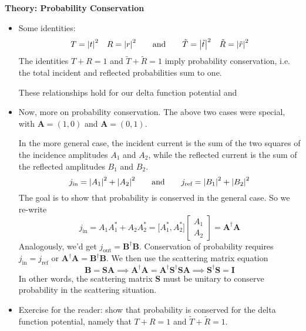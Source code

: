 \documentclass[11pt, a4paper]{article}
\newcommand{\eqtext}[1]{\qquad \text{#1} \qquad}
\renewcommand{\vec}[1]{\bm{#1}} %
\newcommand{\mat}[1]{\mathbf{#1}} %
\begin{document}
\textbf{Theory: Probability Conservation}
\begin{itemize}
	\item Some identities:
	\begin{equation*}
		T = \abs{t}^{2} \quad R = \abs{r}^{2} \eqtext{and} 		\tilde{T} = \abs{\tilde{t}}^{2} \quad \tilde{R} = \abs{\tilde{r}}^{2}
	\end{equation*}
	The identities $ T + R = 1 $ and $ \tilde{T} + \tilde{R} = 1 $ imply probability conservation, i.e. the total incident and reflected probabilities sum to one. 
	
	These relationships hold for our delta function potential and 
	
	\item Now, more on probability conservation. The above two cases were special, with $ \vec{A} = (1, 0) $ and $ \vec{A} = (0, 1) $. 
	
	In the more general case, the incident current is the sum of the two squares of the incidence amplitudes $ A_{1} $ and $ A_{2} $, while the reflected current is the sum of the reflected amplitudes $ B_{1} $ and $ B_{2} $. 
	\begin{equation*}
		j_{\text{in}} = \abs{A_{1}}^{2} + \abs{A_{2}}^{2} \eqtext{and} j_{\text{ref}} = \abs{B_{1}}^{2} + \abs{B_{2}}^{2}
	\end{equation*}
	The goal is to show that probability is conserved in the general case. So we re-write
	\begin{equation*}
		j_{\text{in}} = A_{1}A_{1}^{*} + A_{2}A_{2}^{*} = \big[A_{1}^{*}, A_{2}^{*}\big]
		\begin{bmatrix}
			A_{1}\\
			A_{2}
		\end{bmatrix}
		= \vec{A}^{\dagger}\vec{A}
	\end{equation*}
	Analogously, we'd get $ j_{\text{out}} = \vec{B}^{\dagger}\vec{B} $. Conservation of probability requires $ j_{\text{in}} = j_{\text{ref}} $ or $ \vec{A}^{\dagger}\vec{A} = \vec{B}^{\dagger}\vec{B} $. We then use the scattering matrix equation 
	\begin{equation*}
		\vec{B} = \mat{S}\vec{A} \implies \vec{A}^{\dagger}\vec{A} = \mat{A}^{\dagger}\vec{S}^{\dagger}\mat{S}\vec{A} \implies \vec{S}^{\dagger}\mat{S} = \mat{I}
	\end{equation*}
	In other words, the scattering matrix $ \mat{S} $ must be unitary to conserve probability in the scattering situation.

	\item Exercise for the reader: show that probability is conserved for the delta function potential, namely that $ T + R = 1 $ and $ \tilde{T} + \tilde{R} = 1 $.
\end{itemize}
\end{document}
